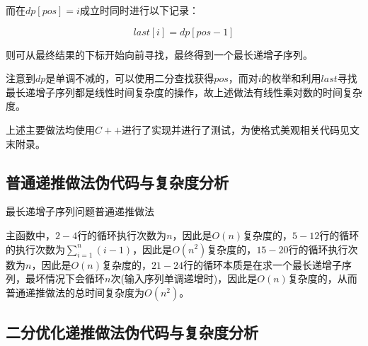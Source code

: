 \documentclass{article}
\begin{document}
而在$dp[pos]=i$成立时同时进行以下记录：

$$
last[i]=dp[pos-1]
$$

则可从最终结果的下标开始向前寻找，最终得到一个最长递增子序列。

注意到$dp$是单调不减的，可以使用二分查找获得$pos$，而对$i$的枚举和利用$last$寻找最长递增子序列都是线性时间复杂度的操作，故上述做法有线性乘对数的时间复杂度。

上述主要做法均使用$C++$进行了实现并进行了测试，为使格式美观相关代码见文末附录。

\subsection{普通递推做法伪代码与复杂度分析}

\begin{algorithm}[H]

\caption{最长递增子序列问题普通递推做法}
\LinesNumbered
{}


\end{algorithm}

主函数中，$2-4$行的循环执行次数为$n$，因此是$O(n)$复杂度的，$5-12$行的循环的执行次数为$\sum_{i=1}^n(i-1)$，因此是$O(n^2)$复杂度的，$15-20$行的循环执行次数为$n$，因此是$O(n)$复杂度的，$21-24$行的循环本质是在求一个最长递增子序列，最坏情况下会循环$n$次(输入序列单调递增时)，因此是$O(n)$复杂度的，从而普通递推做法的总时间复杂度为$O(n^2)$。

\subsection{二分优化递推做法伪代码与复杂度分析}
\end{document}
